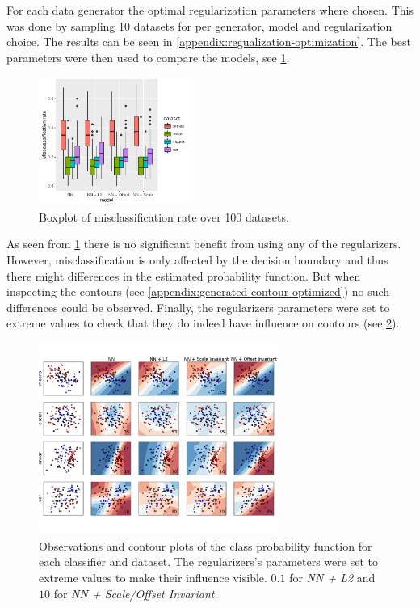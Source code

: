 For each data generator the optimal regularization parameters where chosen. This was done by sampling 10 datasets for per generator, model and regularization choice. The results can be seen in \cref{appendix:regualization-optimization}. The best parameters were then used to compare the models, see \cref{fig:2d_significant}.

\begin{figure}[h]
	\centering
	\includegraphics[width=0.45\textwidth]{plots/2d_significant}
	\caption{Boxplot of misclassification rate over 100 datasets.}
	\label{fig:2d_significant}
\end{figure}

As seen from \cref{fig:2d_significant} there is no significant benefit from using any of the regularizers. However, misclassification is only affected by the decision boundary and thus there might differences in the estimated probability function. But when inspecting the contours (see \cref{appendix:generated-contour-optimized}) no such differences could be observed. Finally, the regularizers parameters were set to extreme values to check that they do indeed have influence on contours (see \cref{plt:generated-contour-extream}).

\begin{figure}[ht]
	\centering
	\includegraphics[width=0.7\textwidth, trim = 0 2.2cm 0 1.5cm, clip]{plots/2d_classifier-extream}
	\caption{Observations and contour plots of the class probability function for each classifier and dataset. The regularizers's parameters were set to extreme values to make their influence visible. $0.1$ for \textit{NN + L2} and $10$ for \textit{NN + Scale/Offset Invariant}.}
	\label{plt:generated-contour-extream}
\end{figure}
